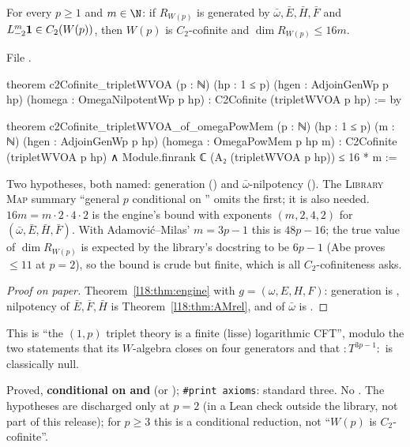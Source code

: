 \begin{theorem}\label{l18:thm:c2general}
For every $p\ge1$ and $m\in\N$: if $R_{W(p)}$ is generated by $\bar\omega,\bar E,\bar H,\bar F$ and
$L_{-2}^m\mathbf{1}\in C_2(W(p))$, then $W(p)$ is $C_2$-cofinite and $\dim R_{W(p)}\le16m$.
\end{theorem}
\noindent File .
\begin{leancode}
theorem c2Cofinite_tripletWVOA (p : ℕ) (hp : 1 ≤ p) (hgen : AdjoinGenWp p hp)
    (homega : OmegaNilpotentWp p hp) : C2Cofinite (tripletWVOA p hp) := by

theorem c2Cofinite_tripletWVOA_of_omegaPowMem (p : ℕ) (hp : 1 ≤ p) (m : ℕ)
    (hgen : AdjoinGenWp p hp) (homega : OmegaPowMem p hp m) :
    C2Cofinite (tripletWVOA p hp)
      ∧ Module.finrank ℂ (A₂ (tripletWVOA p hp)) ≤ 16 * m :=
\end{leancode}
\begin{dictionary}
Two hypotheses, both named: generation () and $\bar\omega$-nilpotency (). The
\textsc{Library Map} summary ``general $p$ conditional on '' omits the first; it is
also needed. $16m=m\cdot2\cdot4\cdot2$ is the engine's bound with exponents $(m,2,4,2)$ for
$(\bar\omega,\bar E,\bar H,\bar F)$. With Adamovi\'c--Milas' $m=3p-1$ this is $48p-16$; the true value
of $\dim R_{W(p)}$ is expected by the library's docstring to be $6p-1$ (Abe proves $\le11$ at $p=2$), so the bound is crude but finite,
which is all $C_2$-cofiniteness asks.
\end{dictionary}
\begin{proof}[Proof on paper]
Theorem~\ref{l18:thm:engine} with $g=(\omega,E,H,F)$: generation is , nilpotency of
$\bar E,\bar F,\bar H$ is Theorem~\ref{l18:thm:AMrel}, and of $\bar\omega$ is .
\end{proof}
\begin{physics}
This is ``the $(1,p)$ triplet theory is a finite (lisse) logarithmic CFT'', modulo the two
statements that its $W$-algebra closes on four generators and that $:T^{3p-1}:$ is classically null.
\end{physics}
\begin{status}
Proved, \textbf{conditional on  and } (or
); \texttt{\#print axioms}: standard three. No . The hypotheses are discharged only at
$p=2$ (in a Lean check outside the library, not part of this release); for $p\ge3$ this is a conditional reduction, not ``$W(p)$ is $C_2$-cofinite''.
\end{status}


